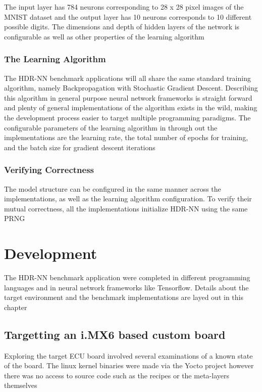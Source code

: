 The input layer has 784 neurons corresponding to 28 x 28 pixel images of the MNIST dataset and the output layer has 10 neurons corresponds to 10 different possible digits. The dimensions and depth of hidden layers of the network is configurable as well as other properties of the learning algorithm

\subsection[HDR-NN Training]{The Learning Algorithm}

The HDR-NN benchmark applications will all share the same standard training algorithm, namely Backpropagation with Stochastic Gradient Descent. Describing this algorithm in general purpose neural network frameworks is straight forward and plenty of general implementations of the algorithm exists in the wild, making the development process easier to target multiple programming paradigms. The configurable parameters of the learning algorithm in through out the implementations are the learning rate, the total number of epochs for training, and the batch size for gradient descent iterations

\subsection[Verifying Correctness]{Verifying Correctness}

The model structure can be configured in the same manner across the implementations, as well as the learning algorithm configuration. To verify their mutual correctness, all the implementations initialize HDR-NN using the same PRNG

\chapter{Development}

The HDR-NN benchmark application were completed in different programming languages and in neural network frameworks like Tensorflow. Details about the target environment and the benchmark implementations are layed out in this chapter

\section[iMX6 Custom Board Target]{Targetting an i.MX6 based custom board}

Exploring the target ECU board involved several examinations of a known state of the board. The linux kernel binaries were made via the Yocto project however there was no access to source code such as the recipes or the meta-layers themselves

